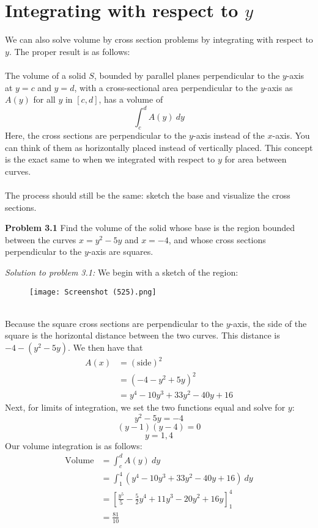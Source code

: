 \documentclass[11pt]{scrartcl}
\begin{document}
\section{Integrating with respect to $y$}
\noindent 
We can also solve volume by cross section problems by integrating with respect to $y$. The proper result is as follows: \\
\\
\noindent 
The volume of a solid $S$, bounded by parallel planes perpendicular to the $y$-axis at $y=c$ and $y=d$, with a cross-sectional area perpendicular to the $y$-axis as $A(y)$ for all $y$ in $[c,d]$, has a volume of
$$\int_c^d{A(y)} \ dy$$
\noindent 
Here, the cross sections are perpendicular to the $y$-axis instead of the $x$-axis. You can think of them as horizontally placed instead of vertically placed. This concept is the exact same to when we integrated with respect to $y$ for area between curves. \\
\\
\noindent 
The process should still be the same: sketch the base and visualize the cross sections. 
\begin{tcolorbox}[colback=purple!5!white,colframe=purple!75!black] 
\textbf{Problem 3.1} Find the volume of the solid whose base is the region bounded between the curves $x=y^2-5y$ and $x=-4$, and whose cross sections perpendicular to the $y$-axis are squares. 
\end{tcolorbox}
\noindent
\textit{Solution to problem 3.1:} We begin with a sketch of the region: 

\begin{figure}[htp]
    \centering
    \texttt{[image: Screenshot (525).png]}
\end{figure}\\
\noindent 
Because the square cross sections are perpendicular to the $y$-axis, the side of the square is the horizontal distance between the two curves. This distance is $-4-(y^2-5y)$. We then have that 
\begin{align*}
    A(x) &=(\text{side})^2 \\
         &=(-4-y^2+5y)^2 \\
         &=y^4-10y^3+33y^2-40y+16
\end{align*}
\noindent 
Next, for limits of integration, we set the two functions equal and solve for $y$: 
$$y^2-5y=-4$$
$$(y-1)(y-4)=0$$
$$y=1,4$$
\noindent 
Our volume integration is as follows: 
\begin{align*}
    \text{Volume} &= \int_c^d {A(y) \ dy} \\
                  &= \int_1^4 {(y^4-10y^3+33y^2-40y+16)} \ dy \\
                  &=\left[\frac{y^5}{5}-\frac{5}{2}y^4+11y^3-20y^2+16y\right]_1^4 \\
                  &=\frac{81}{10}
\end{align*}
\end{document}
